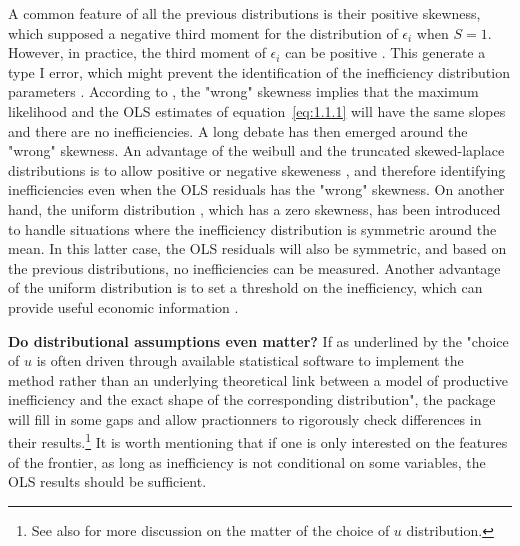 \documentclass[nojss]{jss}
\begin{document}
A common feature of all the previous distributions is their positive skewness, 
which supposed a negative third moment for the distribution of 
$\epsilon_i$ when $S=1$. However, in practice, the third moment of 
$\epsilon_i$ can be positive \citep{sw09}. This generate a type I error, which 
might prevent the identification of the inefficiency distribution parameters 
\citep{olson80}. According to \citet{wald82}, the "wrong" skewness implies that 
the maximum likelihood and the OLS estimates of equation~\ref{eq:1.1.1} will have 
the same slopes and there are no inefficiencies. A long debate has then emerged 
around the "wrong" skewness. An advantage of the weibull and 
the truncated skewed-laplace distributions is to allow positive 
or negative skeweness \citep{tsionas07, wang12}, and therefore identifying inefficiencies even when the OLS
residuals has the "wrong" skewness. On another hand, the uniform distribution 
\citet{li96, nguyen10, lee14}, which has a zero skewness, has been introduced to  
handle situations where the inefficiency distribution is symmetric around the 
mean. In this latter case, the OLS residuals will also be symmetric, and based on 
the previous distributions, no inefficiencies can be measured. Another advantage
of the uniform distribution is to set a threshold on the inefficiency, which can
provide useful economic information \citep{lee14}.

\textbf{Do distributional assumptions even matter?} If as underlined by 
\citet[p.~16]{kum20} the "choice of $u$ is often driven through available statistical 
software to implement the method rather than an underlying theoretical link 
between a model of productive inefficiency and the exact shape of the 
corresponding distribution", the  package will fill in some gaps and 
allow practionners to rigorously check differences in their results.\footnote{See 
also \citet[p.~214-216]{par14} for more discussion on the matter of the choice of $u$ distribution.}
It is worth mentioning that if one is only interested on the features of the 
frontier, as long as inefficiency is not conditional on some variables, the OLS
results should be sufficient.
\end{document}
